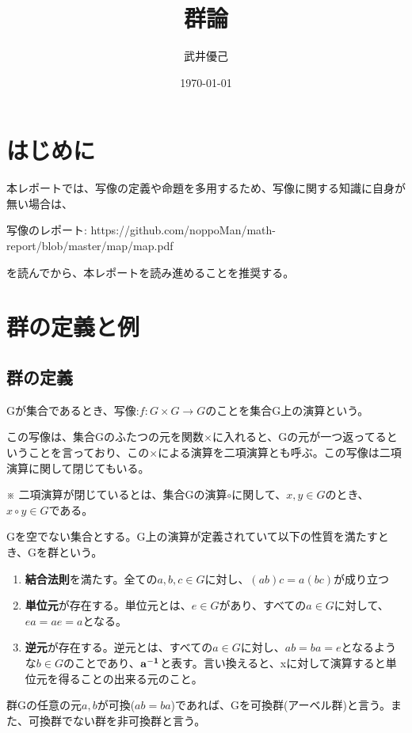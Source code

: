 \documentclass[dvipdfmx,autodetect-engine]{jsarticle}
\title{群論}
\author{武井優己}
\date{\today}
\begin{document}
\maketitle

\section{はじめに}

本レポートでは、写像の定義や命題を多用するため、写像に関する知識に自身が無い場合は、

写像のレポート: https://github.com/noppoMan/math-report/blob/master/map/map.pdf

を読んでから、本レポートを読み進めることを推奨する。

\section{群の定義と例}

\subsection{群の定義}

Gが集合であるとき、写像:$f: G \times G \to {} G$のことを集合G上の演算という。

この写像は、集合Gのふたつの元を関数$\times$に入れると、Gの元が一つ返ってるということを言っており、この$\times$による演算を二項演算とも呼ぶ。この写像は二項演算に関して閉じてもいる。

※ 二項演算が閉じているとは、集合Gの演算$\circ$に関して、$x, y \in G$のとき、$x \circ y \in G$である。

Gを空でない集合とする。G上の演算が定義されていて以下の性質を満たすとき、Gを群という。

\begin{enumerate}
\renewcommand{\labelenumi}{(\arabic{enumi})}
    \item {\bf 結合法則}を満たす。全ての$a, b, c \in G$に対し、$(ab)c = a(bc)$が成り立つ
	\item {\bf 単位元}が存在する。単位元とは、$e \in G$があり、すべての$a \in G$に対して、$ea = ae = a$となる。
	\item {\bf 逆元}が存在する。逆元とは、すべての$a \in G$に対し、$ab = ba = e$となるような$b \in G$のことであり、${\bf a^{-1} }$と表す。言い換えると、xに対して演算すると単位元を得ることの出来る元のこと。
\end{enumerate}

群Gの任意の元$a, b$が可換($ab = ba$)であれば、Gを可換群(アーベル群)と言う。また、可換群でない群を非可換群と言う。
\end{document}
